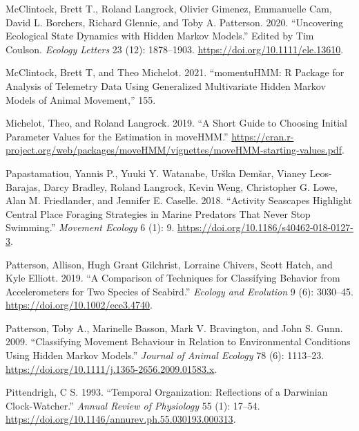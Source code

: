 \documentclass[msc,numbers,hidelinks]{coppe}
\newlength{\cslhangindent}
\newenvironment{CSLReferences}[2] %
 {%
  \setlength{\parindent}{0pt}
  \ifodd #1 \everypar{\setlength{\hangindent}{\cslhangindent}}\ignorespaces\fi
  \ifnum #2 > 0
  \setlength{\parskip}{#2\baselineskip}
  \fi
 }%
 {}
\begin{document}
\begin{CSLReferences}{1}{0}
  \leavevmode{}%
  McClintock, Brett T., Roland Langrock, Olivier Gimenez, Emmanuelle Cam, David L. Borchers, Richard Glennie, and Toby A. Patterson. 2020. {``Uncovering Ecological State Dynamics with Hidden Markov Models.''} Edited by Tim Coulson. \emph{Ecology Letters} 23 (12): 1878--1903. \url{https://doi.org/10.1111/ele.13610}.

  \leavevmode{}%
  McClintock, Brett T, and Theo Michelot. 2021. {``momentuHMM: R Package for Analysis of Telemetry Data Using Generalized Multivariate Hidden Markov Models of Animal Movement,''} 155.

  \leavevmode{}%
  Michelot, Theo, and Roland Langrock. 2019. {``A Short Guide to Choosing Initial Parameter Values for the Estimation in {moveHMM}.''} \url{https://cran.r-project.org/web/packages/moveHMM/vignettes/moveHMM-starting-values.pdf}.

  \leavevmode{}%
  Papastamatiou, Yannis P., Yuuki Y. Watanabe, Urška Demšar, Vianey Leos-Barajas, Darcy Bradley, Roland Langrock, Kevin Weng, Christopher G. Lowe, Alan M. Friedlander, and Jennifer E. Caselle. 2018. {``Activity Seascapes Highlight Central Place Foraging Strategies in Marine Predators That Never Stop Swimming.''} \emph{Movement Ecology} 6 (1): 9. \url{https://doi.org/10.1186/s40462-018-0127-3}.

  \leavevmode{}%
  Patterson, Allison, Hugh Grant Gilchrist, Lorraine Chivers, Scott Hatch, and Kyle Elliott. 2019. {``A Comparison of Techniques for Classifying Behavior from Accelerometers for Two Species of Seabird.''} \emph{Ecology and Evolution} 9 (6): 3030--45. \url{https://doi.org/10.1002/ece3.4740}.

  \leavevmode{}%
  Patterson, Toby A., Marinelle Basson, Mark V. Bravington, and John S. Gunn. 2009. {``Classifying Movement Behaviour in Relation to Environmental Conditions Using Hidden {Markov} Models.''} \emph{Journal of Animal Ecology} 78 (6): 1113--23. \url{https://doi.org/10.1111/j.1365-2656.2009.01583.x}.

  \leavevmode{}%
  Pittendrigh, C S. 1993. {``Temporal {Organization}: {Reflections} of a {Darwinian Clock-Watcher}.''} \emph{Annual Review of Physiology} 55 (1): 17--54. \url{https://doi.org/10.1146/annurev.ph.55.030193.000313}.


\end{CSLReferences}
\end{document}
